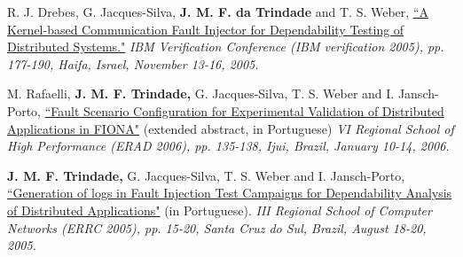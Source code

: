 \documentclass[line,margin]{res}
\begin{document}
\begin{resume}
R. J. Drebes, G. Jacques-Silva, \textbf{J. M. F. da Trindade} and T. S. Weber, \href{http://www.haifa.ibm.com/Workshops/PADTAD2005/papers/drebes.pdf}{``A Kernel-based Communication Fault Injector for Dependability Testing of Distributed Systems."} \textit{IBM Verification Conference (IBM verification 2005), pp. 177-190, Haifa, Israel, November 13-16, 2005.}

M. Rafaelli, \textbf{J. M. F. Trindade,} G. Jacques-Silva, T. S. Weber and I. Jansch-Porto, \href{http://joanatrindade.wikidot.com/local--files/curriculum/erad2006.pdf}{``Fault Scenario Configuration for Experimental Validation of Distributed Applications in FIONA"} (extended abstract, in Portuguese) \textit{VI Regional School of High Performance (ERAD 2006), pp. 135-138, Ijui, Brazil, January 10-14, 2006.}

\textbf{J. M. F. Trindade,} G. Jacques-Silva, T. S. Weber and I. Jansch-Porto, \href{http://joanatrindade.wikidot.com/local--files/curriculum/errc2005.pdf}{``Generation of logs in Fault Injection Test Campaigns for Dependability Analysis of Distributed Applications"} (in Portuguese). \textit{III Regional School of Computer Networks (ERRC 2005), pp. 15-20, Santa Cruz do Sul, Brazil, August 18-20, 2005.}




\end{resume}
\end{document}
